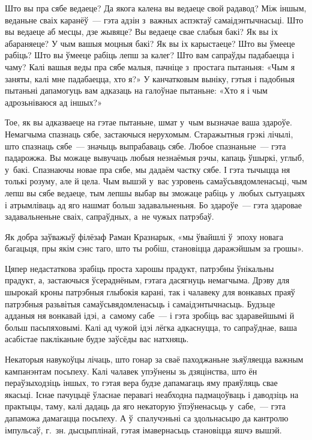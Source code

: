 Што вы пра сябе ведаеце? Да якога калена вы ведаеце свой радавод? Між іншым, веданьне сваіх каранёў~--- гэта адзін з~важных аспэктаў самаідэнтычнасьці. Што вы ведаеце аб месцы, дзе жывяце? Вы ведаеце свае слабыя бакі? Як вы іх абараняеце? У чым вашыя моцныя бакі? Як вы іх карыстаеце? Што вы ўмееце рабіць? Што вы ўмееце рабіць лепш за калег? Што вам сапраўды падабаецца і чаму? Калі вашыя веды пра сябе малыя, пачніце з~простага пытаньня: «Чым я заняты, калі мне падабаецца, хто я?» У канчатковым выніку, гэтыя і падобныя пытаньні дапамогуць вам адказаць на галоўнае пытаньне: «Хто я і чым адрозьніваюся ад іншых?»

Тое, як вы адказваеце на гэтае пытаньне, шмат у~чым вызначае ваша здароўе. Немагчыма спазнаць сябе, застаючыся нерухомым. Старажытныя грэкі лічылі, што спазнаць сябе~--- значыць выпрабаваць сябе. Любое спазнаньне~--- гэта падарожжа. Вы можаце вывучаць любыя незнаёмыя рэчы, капаць ўшыркі, углыб, у~бакі. Спазнаючы новае пра сябе, мы дадаём частку сябе. І гэта тычыцца ня толькі розуму, але й цела. Чым вышэй у~вас узровень самаўсьвядомленасьці, чым лепш вы сябе ведаеце, тым лепшы выбар вы зможаце рабіць у~любых сытуацыях і атрымліваць ад яго нашмат больш задавальненьня. Бо здароўе~--- гэта здаровае задавальненьне сваіх, сапраўдных, а~не чужых патрэбаў.

Як добра заўважыў філёзаф Раман Кразнарык, «мы ўвайшлі ў~эпоху новага багацьця, пры якім сэнс таго, што ты робіш, становіцца даражэйшым за грошы».

Цяпер недастаткова зрабіць проста харошы прадукт, патрэбны ўнікальны прадукт, а, застаючыся ўсераднёным, гэтага дасягнуць немагчыма. Дрэву для шырокай кроны патрэбныя глыбокія карані, так і чалавеку для вонкавых праяў патрэбныя разьвітыя самаўсьвядомленасьць і самаідэнтычнасьць. Будзьце адданыя ня вонкавай ідэі, а~самому сабе~--- і гэта зробіць вас здаравейшымі й больш пасьпяховымі. Калі ад чужой ідэі лёгка адкаснуцца, то сапраўднае, ваша асабістае пакліканьне будзе заўсёды вас натхняць.

Некаторыя навукоўцы лічаць, што гонар за сваё паходжаньне зьяўляецца важным кампанэнтам посьпеху. Калі чалавек упэўнены зь дзяцінства, што ён пераўзыходзіць іншых, то гэтая вера будзе дапамагаць яму праяўляць свае якасьці. Існае пачуцьцё ўласнае перавагі неабходна падмацоўваць і даводзіць на практыцы, таму, калі дадаць да яго некаторую ўпэўненасьць у~сабе,~--- гэта дапаможа дамагацца посьпеху. А ў~спалучэньні са здольнасьцю да кантролю імпульсаў, г.~зн. дысцыплінай, гэтая імавернасьць становіцца яшчэ вышэй.

